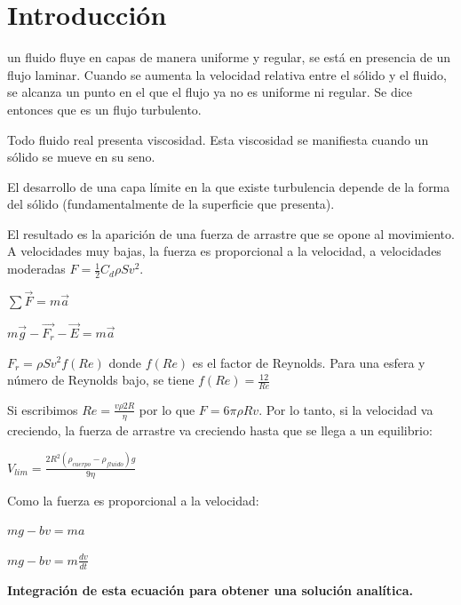 \documentclass[journal]{IEEEtran}
\begin{document}
%
\IEEEpeerreviewmaketitle

\section{Introducción}

 un fluido fluye en capas de manera uniforme y regular, se está en presencia de un flujo laminar. Cuando se aumenta la velocidad relativa entre el sólido y el fluido, se alcanza un punto en el que el flujo ya no es uniforme ni regular. Se dice entonces que es un flujo turbulento.

Todo fluido real presenta viscosidad. Esta viscosidad se manifiesta cuando un sólido se mueve en su seno.

El desarrollo de una capa límite en la que existe turbulencia depende de la forma del sólido (fundamentalmente de la superficie que presenta).

El resultado es la aparición de una fuerza de arrastre que se opone al movimiento. A velocidades muy bajas, la fuerza es proporcional a la velocidad, a velocidades moderadas $F = \displaystyle\frac{1}{2} C_d \rho S v^2$.

$\sum \vec{F} = m\vec{a}$

$m\vec{g} - \vec{F_r} - \vec{E} = m\vec{a}$

$F_r = \rho S v^2 f(Re)$ donde $f(Re)$ es el factor de Reynolds. Para una esfera y número de Reynolds bajo, se tiene $f(Re) = \displaystyle\frac{12}{Re}$

Si escribimos $Re = \displaystyle\frac{v \rho 2 R}{\eta}$ por lo que $F = 6 \pi \rho R v$. Por lo tanto, si la velocidad va creciendo, la fuerza de arrastre va creciendo hasta que se llega a un equilibrio:

$V_{lim} = \displaystyle\frac{2 R^2 (\rho_{cuerpo} - \rho_{fluido}) g}{9 \eta}$

Como la fuerza es proporcional a la velocidad:

$mg - bv = ma$

$mg - bv = m \displaystyle\frac{dv}{dt}$

\textbf{Integración de esta ecuación para obtener una solución analítica.}
\end{document}
